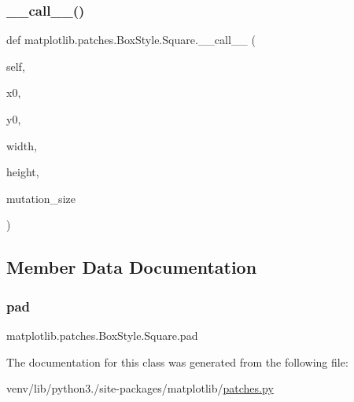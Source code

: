 \subsubsection{\texorpdfstring{\+\_\+\+\_\+call\+\_\+\+\_\+()}{\_\_call\_\_()}}
{\footnotesize\ttfamily def matplotlib.\+patches.\+Box\+Style.\+Square.\+\_\+\+\_\+call\+\_\+\+\_\+ (\begin{DoxyParamCaption}\item[{}]{self,  }\item[{}]{x0,  }\item[{}]{y0,  }\item[{}]{width,  }\item[{}]{height,  }\item[{}]{mutation\+\_\+size }\end{DoxyParamCaption})}



\subsection{Member Data Documentation}
\mbox{\label{classmatplotlib_1_1patches_1_1BoxStyle_1_1Square_a4a36206a4868c89251482d499c23b483}} 
\subsubsection{\texorpdfstring{pad}{pad}}
{\footnotesize\ttfamily matplotlib.\+patches.\+Box\+Style.\+Square.\+pad}



The documentation for this class was generated from the following file\+:\begin{DoxyCompactItemize}
\item 
venv/lib/python3./site-\/packages/matplotlib/\hyperlink{patches_8py}{patches.\+py}\end{DoxyCompactItemize}

